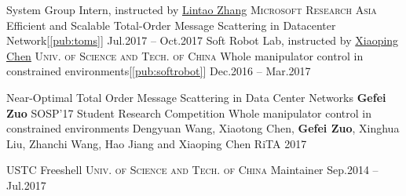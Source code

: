 \documentclass[10pt,a4paper]{article}
\newcommand{\seperator}{\spacedhrule{0.5em}{-1em}}
\begin{document}
\headedsection
{System Group Intern, instructed by \href{https://www.microsoft.com/en-us/research/people/lintaoz/}{Lintao Zhang}}
{\textsc{Microsoft Research Asia}}
{
	\headedsubsection
	{Efficient and Scalable Total-Order Message Scattering in Datacenter Network[\ref{pub:toms}]}
	{Jul.2017 -- Oct.2017}
	{}
}
\headedsection
{Soft Robot Lab, instructed by \href{http://ai.ustc.edu.cn/}{Xiaoping Chen}}
{\textsc{Univ. of Science and Tech. of China}}
{
	\headedsubsection
	{Whole manipulator control in constrained environments[\ref{pub:softrobot}]}
	{Dec.2016 -- Mar.2017}
	{}
}

\seperator
{}
\publication
	{Near-Optimal Total Order Message Scattering in Data Center Networks\label{pub:toms}}
	{\textbf{Gefei Zuo}}
	{SOSP'17 Student Research Competition}
\publication
	{Whole manipulator control in constrained environments\label{pub:softrobot}}
	{Dengyuan Wang, Xiaotong Chen, \textbf{Gefei Zuo}, Xinghua Liu, Zhanchi Wang, Hao Jiang and Xiaoping Chen}
	{RiTA 2017}

\seperator


\headedsection  %
{USTC Freeshell}
{\textsc{Univ. of Science and Tech. of China}} {
	\headedsubsection
	{Maintainer}
	{Sep.2014 -- Jul.2017}
	{}
	}
\end{document}
